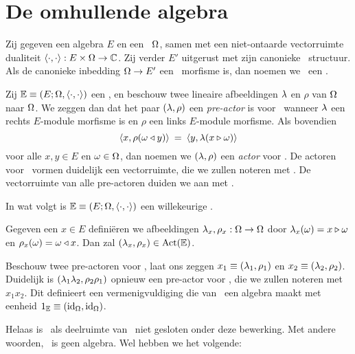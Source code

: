 \documentclass{book}
\begin{document}
\section{De omhullende algebra}

\begin{defn} \rm
Zij gegeven een algebra $E$ en een \Ebimod\ $\Omega$, samen met een niet-ontaarde
vectorruimte dualiteit $\langle\cdot, \cdot\rangle : E \times \Omega \rightarrow \mathbb{C}$.
Zij verder $E'$ uitgerust met zijn canonieke \Ebimod\ structuur.
Als de canonieke inbedding $\Omega \rightarrow E'$ een \Ebimod\ morfisme is,
dan noemen we \EOP\ een {\em\context}\@.
\end{defn}


\begin{defn} \rm
Zij $\mathbb{E} \equiv (E; \Omega, \langle\cdot, \cdot\rangle)$ een \context, en beschouw twee lineaire afbeeldingen $\lambda$ en $\rho$
van $\Omega$ naar $\Omega$. We zeggen dan dat het paar $(\lambda,\rho)$ een {\em pre-actor\/}
is voor \EE\ wanneer $\lambda$ een rechts $E$-module morfisme is en $\rho$ een
links $E$-module morfisme. Als bovendien
\begin{equation} \label{biap}
   \langle x,\rho(\omega \triangleleft y) \rangle  \:=\:  \langle y,\lambda(x\triangleright\omega) \rangle
\end{equation}
voor alle $x,y \in E$ en $\omega \in \Omega$, dan noemen we $(\lambda,\rho)$
een {\em actor\/} voor \EE\@.
De actoren voor \EE\ vormen duidelijk een vectorruimte, die we zullen noteren met \ActE\@.
De vectorruimte van alle pre-actoren duiden we aan met \PreE\@.
\end{defn}


In wat volgt is $\mathbb{E} \equiv (E; \Omega, \langle\cdot, \cdot\rangle)$ een willekeurige \context\@.

\begin{lemma} \label{lem:embedding_of_E}
Gegeven een\/ $x\in E$ defini\"eren we afbeeldingen\/ $\lambda_x, \rho_x : \Omega \rightarrow \Omega$
door\/ $\lambda_x(\omega) = x \triangleright \omega$ en\/ $\rho_x(\omega) = \omega \triangleleft x$.
Dan zal\/ $(\lambda_x,\rho_x) \in \mbox{\rm Act}(\mathbb{E})$.
\end{lemma}


\begin{defn} \rm \label{def:product_of_actors}
Beschouw twee pre-actoren voor \EE, laat ons zeggen
$x_1 \equiv (\lambda_1,\rho_1)$ en $x_2 \equiv (\lambda_2,\rho_2)$.
Duidelijk is $(\lambda_1\lambda_2,\rho_2\rho_1)$ opnieuw een pre-actor voor \EE,
die we zullen noteren met $x_1 x_2$.
Dit definieert een vermenigvuldiging die van \PreE\ een algebra maakt
met eenheid $1_{\mathbb{E}} \equiv (\mbox{\rm id}_\Omega,\mbox{\rm id}_\Omega)$.
\end{defn}


Helaas is \ActE\ als deelruimte van \PreE\ niet gesloten onder deze bewerking.
Met andere woorden, \ActE\ is geen algebra. Wel hebben we het volgende:
\end{document}
